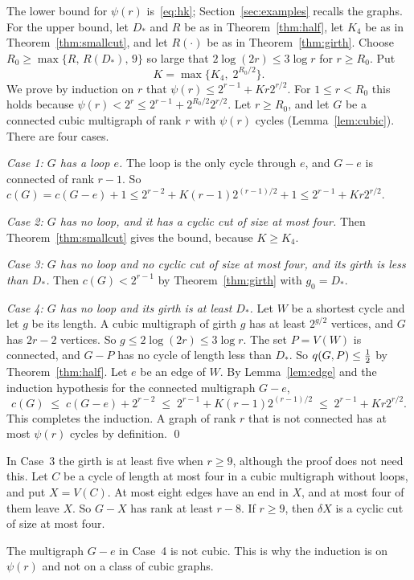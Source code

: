 The lower bound for $\psi(r)$ is~\eqref{eq:hk}; Section~\ref{sec:examples} recalls the graphs.
For the upper bound, let $D_{*}$ and $R$ be as in Theorem~\ref{thm:half}, let $K_4$ be as in
Theorem~\ref{thm:smallcut}, and let $R(\cdot)$ be as in Theorem~\ref{thm:girth}. Choose
$R_0\ge\max\{R,\,R(D_{*}),\,9\}$ so large that $2\log(2r)\le3\log r$ for $r\ge R_0$. Put
\[
  K=\max\bigl\{K_4,\;2^{R_0/2}\bigr\}.
\]
We prove by induction on $r$ that $\psi(r)\le2^{r-1}+Kr2^{r/2}$. For $1\le r<R_0$ this holds because
$\psi(r)<2^{r}\le2^{r-1}+2^{R_0/2}2^{r/2}$. Let $r\ge R_0$, and let $G$ be a connected cubic
multigraph of rank $r$ with $\psi(r)$ cycles (Lemma~\ref{lem:cubic}). There are four cases.

\emph{Case 1: $G$ has a loop $e$.} The loop is the only cycle through $e$, and $G-e$ is connected of
rank $r-1$. So $c(G)=c(G-e)+1\le2^{r-2}+K(r-1)2^{(r-1)/2}+1\le2^{r-1}+Kr2^{r/2}$.

\emph{Case 2: $G$ has no loop, and it has a cyclic cut of size at most four.} Then
Theorem~\ref{thm:smallcut} gives the bound, because $K\ge K_4$.

\emph{Case 3: $G$ has no loop and no cyclic cut of size at most four, and its girth is less than
$D_{*}$.} Then $c(G)<2^{r-1}$ by Theorem~\ref{thm:girth} with $g_0=D_{*}$.

\emph{Case 4: $G$ has no loop and its girth is at least $D_{*}$.} Let $W$ be a shortest cycle and
let $g$ be its length. A cubic multigraph of girth $g$ has at least $2^{g/2}$ vertices, and $G$ has
$2r-2$ vertices. So $g\le2\log(2r)\le3\log r$. The set $P=V(W)$ is connected, and $G-P$ has no cycle
of length less than $D_{*}$. So $q(G,P)\le\tfrac12$ by Theorem~\ref{thm:half}. Let $e$ be an edge of
$W$. By Lemma~\ref{lem:edge} and the induction hypothesis for the connected multigraph $G-e$,
\[
  c(G)\;\le\;c(G-e)+2^{r-2}\;\le\;2^{r-1}+K(r-1)2^{(r-1)/2}\;\le\;2^{r-1}+Kr2^{r/2}.
\]
This completes the induction. A graph of rank $r$ that is not connected has at most $\psi(r)$
cycles by definition. \qed

\begin{remark}
In Case~3 the girth is at least five when $r\ge9$, although the proof does not need this. Let $C$
be a cycle of length at most four in a cubic multigraph without loops, and put $X=V(C)$. At most
eight edges have an end in $X$, and at most four of them leave $X$. So $G-X$ has rank at least
$r-8$. If $r\ge9$, then $\delta X$ is a cyclic cut of size at most four.
\end{remark}

\begin{remark}
The multigraph $G-e$ in Case~4 is not cubic. This is why the induction is on $\psi(r)$ and not on a
class of cubic graphs.
\end{remark}
